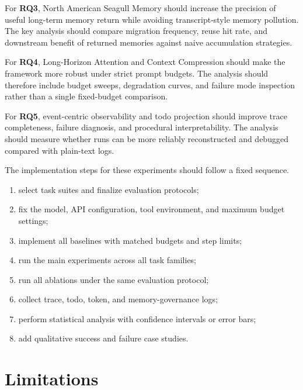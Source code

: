 \documentclass[a4paper,fleqn]{cas-sc}
\begin{document}
For \textbf{RQ3}, North American Seagull Memory should increase the precision of useful long-term memory return while avoiding transcript-style memory pollution. The key analysis should compare migration frequency, reuse hit rate, and downstream benefit of returned memories against naive accumulation strategies.

For \textbf{RQ4}, Long-Horizon Attention and Context Compression should make the framework more robust under strict prompt budgets. The analysis should therefore include budget sweeps, degradation curves, and failure mode inspection rather than a single fixed-budget comparison.

For \textbf{RQ5}, event-centric observability and todo projection should improve trace completeness, failure diagnosis, and procedural interpretability. The analysis should measure whether runs can be more reliably reconstructed and debugged compared with plain-text logs.

The implementation steps for these experiments should follow a fixed sequence.
\begin{enumerate}
\item select task suites and finalize evaluation protocols;
\item fix the model, API configuration, tool environment, and maximum budget settings;
\item implement all baselines with matched budgets and step limits;
\item run the main experiments across all task families;
\item run all ablations under the same evaluation protocol;
\item collect trace, todo, token, and memory-governance logs;
\item perform statistical analysis with confidence intervals or error bars;
\item add qualitative success and failure case studies.
\end{enumerate}

\section{Limitations}
\end{document}
